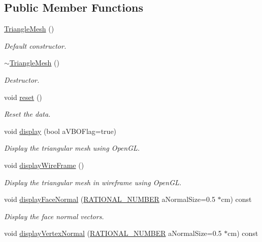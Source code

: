 \subsection*{Public Member Functions}
\begin{DoxyCompactItemize}
\item 
\hyperlink{class_graphics_1_1_triangle_mesh_ada2d98479ba2f70fd622ba56d4abe0d1}{TriangleMesh} ()
\begin{DoxyCompactList}\small\item\em Default constructor. \end{DoxyCompactList}\item 
\hyperlink{class_graphics_1_1_triangle_mesh_acb7ab0f3560e85b69f86f068de342adf}{$\sim$TriangleMesh} ()
\begin{DoxyCompactList}\small\item\em Destructor. \end{DoxyCompactList}\item 
void \hyperlink{class_graphics_1_1_triangle_mesh_a87bee092cede75257a58d441f10c8f1e}{reset} ()
\begin{DoxyCompactList}\small\item\em Reset the data. \end{DoxyCompactList}\item 
void \hyperlink{class_graphics_1_1_triangle_mesh_a4914ed55a0874fe3951a0d860173aaab}{display} (bool aVBOFlag=true)
\begin{DoxyCompactList}\small\item\em Display the triangular mesh using OpenGL. \end{DoxyCompactList}\item 
void \hyperlink{class_graphics_1_1_triangle_mesh_a4c6e7476fd84c8353932eae154ff6543}{displayWireFrame} ()
\begin{DoxyCompactList}\small\item\em Display the triangular mesh in wireframe using OpenGL. \end{DoxyCompactList}\item 
void \hyperlink{class_graphics_1_1_triangle_mesh_a26136438bcb6d94e9608005317228bdf}{displayFaceNormal} (\hyperlink{namespace_utilities_a40969b96bd8d847b962e297cb79f08ce}{RATIONAL\_\-NUMBER} aNormalSize=0.5 $\ast$cm) const 
\begin{DoxyCompactList}\small\item\em Display the face normal vectors. \end{DoxyCompactList}\item 
void \hyperlink{class_graphics_1_1_triangle_mesh_a59ee2f24eca1fffa9f5e3ead1bb46cf9}{displayVertexNormal} (\hyperlink{namespace_utilities_a40969b96bd8d847b962e297cb79f08ce}{RATIONAL\_\-NUMBER} aNormalSize=0.5 $\ast$cm) const 

\end{DoxyCompactItemize}
